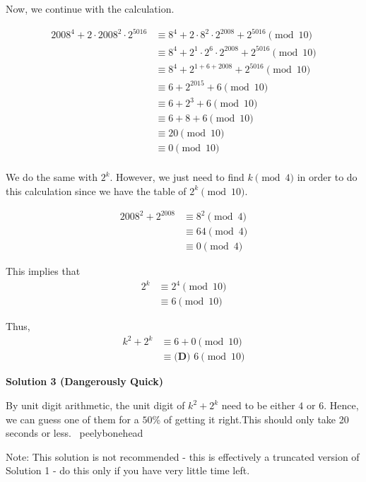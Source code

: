 \begin{enumerate}
 Now, we continue with the calculation.

 
 \begin{align*} 2008^4 + 2 \cdot 2008^2 \cdot 2^{5016} &\equiv 8^4 + 2 \cdot 8^2 \cdot 2^{2008} + 2^{5016} \pmod{10} \\ &\equiv 8^4 + 2^1 \cdot 2^6 \cdot 2^{2008} + 2^{5016} \pmod{10} \\ &\equiv 8^4 + 2^{1+6+2008} + 2^{5016} \pmod{10} \\ &\equiv 6 + 2^{2015} + 6 \pmod{10} \\ &\equiv 6 + 2^{3} + 6 \pmod{10} \\ &\equiv 6 + 8 + 6 \pmod{10} \\ &\equiv 20 \pmod{10} \\ &\equiv 0 \pmod{10} \\ \end{align*}


 We do the same with $2^k.$ However, we just need to find $k \pmod 4$ in order to do this calculation since we have the table of $2^k \pmod {10}.$

 \begin{align*} 2008^2 + 2^{2008} &\equiv 8^2 \pmod{4} \\ &\equiv 64 \pmod 4\\ &\equiv 0 \pmod 4 \end{align*}


 This implies that 
 \begin{align*} 2^k &\equiv 2^{4} \pmod{10} \\ &\equiv 6 \pmod{10} \end{align*}


 Thus, 
 \begin{align*} k^2 + 2^k &\equiv 6+0 \pmod{10}\\ &\equiv \boxed{\textbf{(D) }6} \pmod{10} \end{align*}





\textbf{Solution 3 (Dangerously Quick)}

By unit digit arithmetic, the unit digit of $k^2+2^k$ need to be either $4$ or $6.$ Hence, we can guess one of them for a $50$\% of getting it right.This should only take 20 seconds or less. ~peelybonehead

 Note: This solution is not recommended - this is effectively a truncated version of Solution 1 - do this only if you have very little time left.

 



\end{enumerate}
